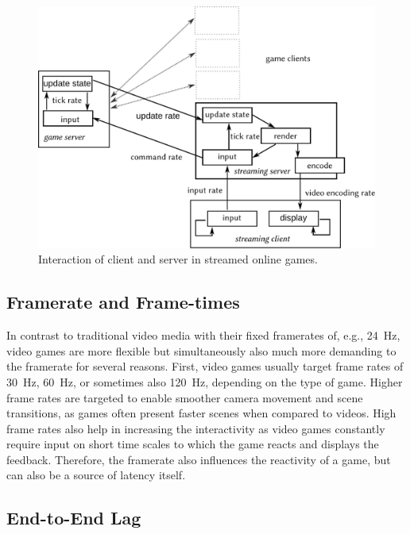 \begin{figure}[!t]
	\centering
	\includegraphics[width=1.0\columnwidth]{../models/game-tick-rate-streamed.pdf}
	\caption{Interaction of client and server in streamed online games.}
\label{fig:tickrate-streamed}
\end{figure}


\subsection{Framerate and Frame-times}
\label{sec:framerate}

In contrast to traditional video media with their fixed framerates of, e.g., \SI{24}{\hertz}, video games are more flexible but simultaneously also much more demanding to the framerate for several reasons. First, video games usually target frame rates of \SI{30}{\hertz}, \SI{60}{\hertz}, or sometimes also \SI{120}{\hertz}, depending on the type of game. Higher frame rates are targeted to enable smoother camera movement and scene transitions, as games often present faster scenes when compared to videos. High frame rates also help in increasing the interactivity as video games constantly require input on short time scales to which the game reacts and displays the feedback. Therefore, the framerate also influences the reactivity of a game, but can also be a source of latency itself.


\subsection{End-to-End Lag}\label{subsec:e2e-lag}

